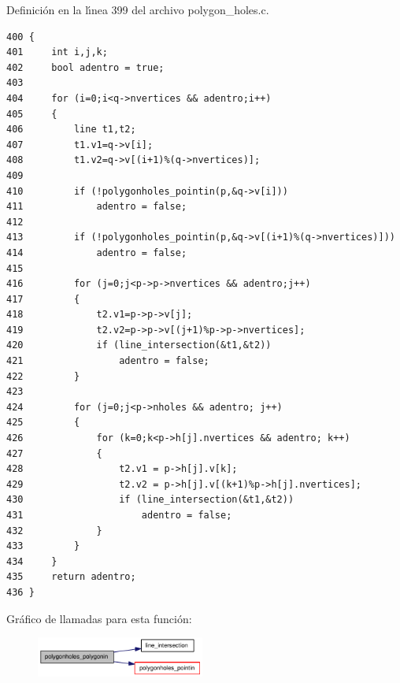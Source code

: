 Definici\'{o}n en la l\'{\i}nea 399 del archivo polygon\_\-holes.c.

\begin{Code}\begin{verbatim}400 {
401     int i,j,k;
402     bool adentro = true;
403 
404     for (i=0;i<q->nvertices && adentro;i++)
405     {
406         line t1,t2;
407         t1.v1=q->v[i];
408         t1.v2=q->v[(i+1)%(q->nvertices)];
409 
410         if (!polygonholes_pointin(p,&q->v[i]))
411             adentro = false;
412 
413         if (!polygonholes_pointin(p,&q->v[(i+1)%(q->nvertices)]))
414             adentro = false;
415 
416         for (j=0;j<p->p->nvertices && adentro;j++)
417         {
418             t2.v1=p->p->v[j];
419             t2.v2=p->p->v[(j+1)%p->p->nvertices];
420             if (line_intersection(&t1,&t2))
421                 adentro = false;
422         }
423 
424         for (j=0;j<p->nholes && adentro; j++)
425         {
426             for (k=0;k<p->h[j].nvertices && adentro; k++)
427             {
428                 t2.v1 = p->h[j].v[k];
429                 t2.v2 = p->h[j].v[(k+1)%p->h[j].nvertices];
430                 if (line_intersection(&t1,&t2))
431                     adentro = false;
432             }
433         }
434     }
435     return adentro;
436 }
\end{verbatim}\end{Code}




Gr\'{a}fico de llamadas para esta funci\'{o}n:\begin{figure}[H]
\begin{center}
\leavevmode
\includegraphics[width=157pt]{group__geometry_g496bae87588cb5710ced80f713da98ad_g496bae87588cb5710ced80f713da98ad_cgraph}
\end{center}
\end{figure}


